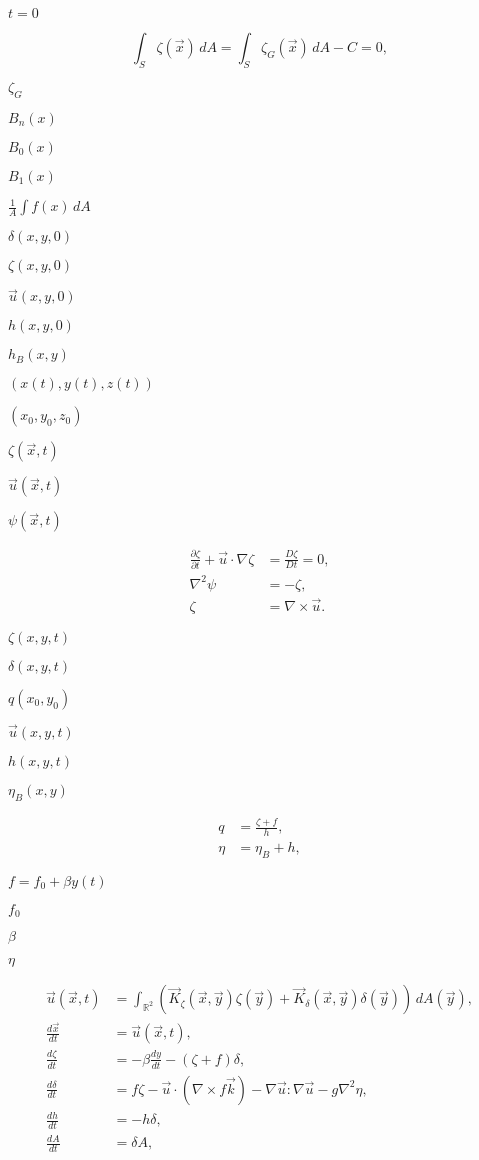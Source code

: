 \documentclass{article}
\begin{document}
$ t = 0 $
\pagebreak

\[ \int_S \zeta(\vec{x})\,dA = \int_{S} \zeta_G(\vec{x})\,dA - C = 0, \]
\pagebreak

$ \zeta_G $
\pagebreak

$ B_n(x) $
\pagebreak

$ B_0(x) $
\pagebreak

$ B_1(x) $
\pagebreak

$ \frac{1}{A} \int f(x)\, dA $
\pagebreak

$ \delta(x,y,0) $
\pagebreak

$ \zeta(x,y,0) $
\pagebreak

$ \vec{u}(x,y,0) $
\pagebreak

$ h(x,y,0) $
\pagebreak

$ h_B(x,y) $
\pagebreak

$ (x(t),y(t),z(t)) $
\pagebreak

$ (x_0, y_0, z_0) $
\pagebreak

$ \zeta(\vec{x},t) $
\pagebreak

$ \vec{u}(\vec{x},t) $
\pagebreak

$ \psi(\vec{x},t) $
\pagebreak

\begin{align*} \frac{\partial \zeta}{\partial t} + \vec{u}\cdot\nabla \zeta & = \frac{D\zeta}{Dt} = 0, \\ \nabla^2 \psi & = - \zeta, \\ \zeta &= \nabla \times \vec{u}. \end{align*}
\pagebreak

$ \zeta(x,y,t) $
\pagebreak

$ \delta(x,y,t) $
\pagebreak

$ q(x_0,y_0) $
\pagebreak

$ \vec{u}(x,y,t) $
\pagebreak

$ h(x,y,t) $
\pagebreak

$ \eta_B(x,y) $
\pagebreak

\begin{align} q &= \frac{\zeta + f}{h}, \\ \eta &= \eta_B + h, \end{align}
\pagebreak

$ f = f_0 + \beta y(t) $
\pagebreak

$ f_0 $
\pagebreak

$ \beta $
\pagebreak

$ \eta $
\pagebreak

\begin{align*} \vec{u}(\vec{x},t) &= \int_{\mathbb{R}^2} \left(\vec{K}_\zeta(\vec{x},\vec{y})\zeta(\vec{y}) + \vec{K}_\delta(\vec{x},\vec{y})\delta(\vec{y})\right)\, dA(\vec{y}), \\ \frac{d\vec{x}}{dt} &= \vec{u}(\vec{x},t), \\ \frac{d\zeta}{dt} &= -\beta \frac{dy}{dt} - (\zeta + f)\delta, \\ \frac{d\delta}{dt} &= f\zeta -\vec{u}\cdot(\nabla\times f\vec{k}) - \nabla\vec{u}:\nabla\vec{u} - g\nabla^2 \eta, \\ \frac{dh}{dt} &= -h\delta, \\ \frac{dA}{dt} &= \delta A, \end{align*}
\pagebreak
\end{document}
